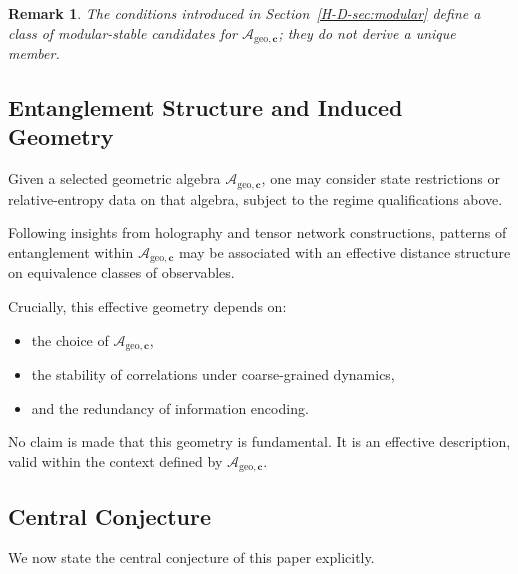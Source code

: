 \documentclass[12pt,a4paper,openany]{book}
\newtheorem{remark}[theorem]{Remark}
\begin{document}
\begin{remark}
The conditions introduced in Section~\ref{H-D-sec:modular} define a class of modular-stable candidates for $\mathcal{A}_{\mathrm{geo},\mathbf{c}}$; they do not derive a unique member.
\end{remark}

\subsection{Entanglement Structure and Induced Geometry}

Given a selected geometric algebra $\mathcal{A}_{\mathrm{geo},\mathbf{c}}$, one may consider state restrictions or relative-entropy data on that algebra, subject to the regime qualifications above.

Following insights from holography and tensor network constructions, patterns of entanglement within $\mathcal{A}_{\mathrm{geo},\mathbf{c}}$ may be associated with an effective distance structure on equivalence classes of observables.

Crucially, this effective geometry depends on:
\begin{itemize}
    \item the choice of $\mathcal{A}_{\mathrm{geo},\mathbf{c}}$,
    \item the stability of correlations under coarse-grained dynamics,
    \item and the redundancy of information encoding.
\end{itemize}

No claim is made that this geometry is fundamental. It is an effective description, valid within the context defined by $\mathcal{A}_{\mathrm{geo},\mathbf{c}}$.

\subsection{Central Conjecture}

We now state the central conjecture of this paper explicitly.
\end{document}
